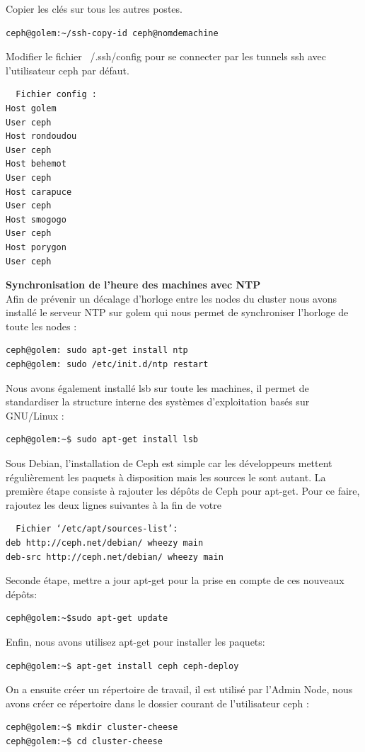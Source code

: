 \documentclass[12pt]{article}
\begin{document}
Copier les clés sur tous les autres postes.
\begin{verbatim}
ceph@golem:~/ssh-copy-id ceph@nomdemachine
\end{verbatim}

Modifier le fichier ~/.ssh/config pour se connecter par les tunnels ssh avec l'utilisateur ceph par défaut.
\begin{verbatim}
  Fichier config :
Host golem
User ceph
Host rondoudou
User ceph
Host behemot
User ceph
Host carapuce
User ceph
Host smogogo
User ceph
Host porygon
User ceph
\end{verbatim}

\textbf{Synchronisation de l'heure des machines avec NTP }
\\Afin de prévenir un décalage d'horloge entre les nodes du cluster nous avons installé le serveur NTP sur golem qui nous permet de synchroniser l'horloge de toute les nodes :
\begin{verbatim}
ceph@golem: sudo apt-get install ntp
ceph@golem: sudo /etc/init.d/ntp restart
\end{verbatim}

Nous avons également installé lsb sur toute les machines, il permet de standardiser la structure interne des systèmes d'exploitation basés sur GNU/Linux :
\begin{verbatim}
ceph@golem:~$ sudo apt-get install lsb
\end{verbatim}

Sous Debian, l'installation de Ceph est simple car les développeurs mettent régulièrement les paquets à disposition mais les sources le sont autant.
La première étape consiste à rajouter les dépôts de Ceph pour apt-get.
Pour ce faire, rajoutez les deux lignes suivantes à la fin de votre
\begin{verbatim}
  Fichier ‘/etc/apt/sources-list’:
deb http://ceph.net/debian/ wheezy main
deb-src http://ceph.net/debian/ wheezy main
\end{verbatim} 
Seconde étape,  mettre a jour apt-get pour la prise en compte de ces nouveaux dépôts:
\begin{verbatim}
ceph@golem:~$sudo apt-get update
\end{verbatim}

Enfin, nous avons utilisez apt-get pour installer les paquets:
\begin{verbatim}
ceph@golem:~$ apt-get install ceph ceph-deploy
\end{verbatim}

On a ensuite créer un répertoire de travail, il est utilisé par l'Admin Node, nous avons créer ce répertoire dans le dossier courant de l'utilisateur ceph :
\begin{verbatim}
ceph@golem:~$ mkdir cluster-cheese
ceph@golem:~$ cd cluster-cheese
\end{verbatim}
\end{document}
